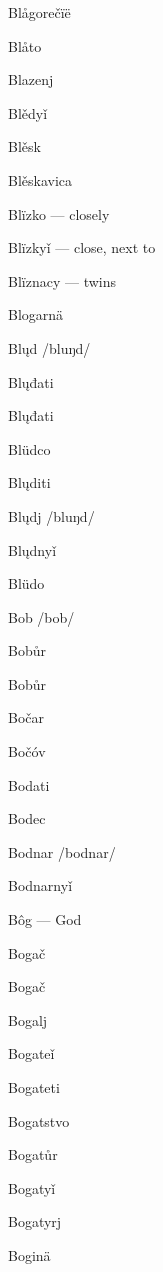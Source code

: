 Blågorečïë 

Blåto 

Blazenj 

Blědyǐ 

Blěsk 

Blěskavica 

Blïzko  — closely

Blïzkyǐ  — close, next to

Blïznacy  — twins

Blogarnä 

Blųd /bluŋd/

Blųđati 

Blųđati 

Blüdco 

Blųditi 

Blųdj /bluŋd/

Blųdnyǐ 

Blüdo 

Bob /bob/

Bobůr 

Bobůr 

Bočar 

Bočóv 

Bodati 

Bodec 

Bodnar /bodnar/

Bodnarnyǐ 

Bôg  — God

Bogač 

Bogač 

Bogalj 

Bogateǐ 

Bogateti 

Bogatstvo 

Bogatůr 

Bogatyǐ 

Bogatyrj 

Boginä 

